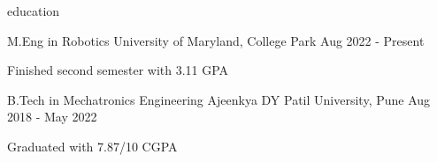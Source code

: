 \begin{section}{education}

  \begin{school}
    {M.Eng in Robotics}
    {University of Maryland, College Park}
    {Aug 2022 - Present}
    
    \item Finished second semester with 3.11 GPA
    
  \end{school}

  \begin{school}
    {B.Tech in Mechatronics Engineering}
    {Ajeenkya DY Patil University, Pune}
    {Aug 2018 - May 2022}

    \item Graduated with 7.87/10 CGPA

  \end{school}

\end{section}